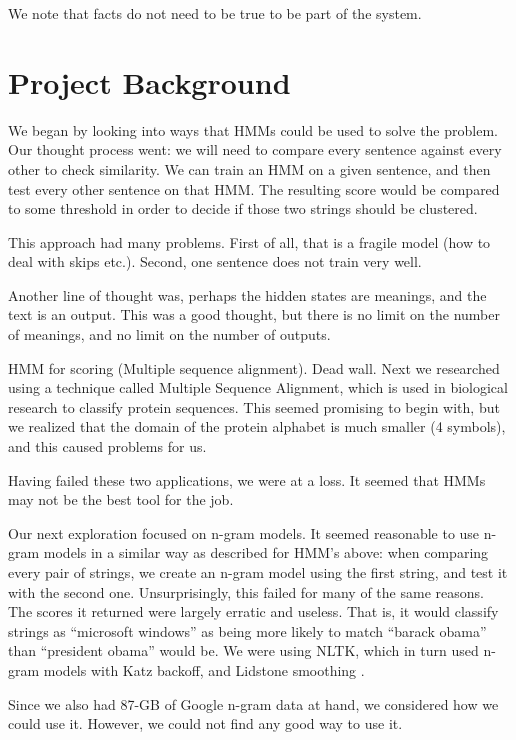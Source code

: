 \documentclass{article}
\begin{document}
We note that facts do not need to be true to be part of the system.



\section{Project Background}
We began by looking into ways that HMMs could be used to solve the problem. Our thought process went: we will need to compare every sentence against every other to check similarity. We can train an HMM on a given sentence, and then test every other sentence on that HMM. The resulting score would be compared to some threshold in order to decide if those two strings should be clustered. 

This approach had many problems. First of all, that is a fragile model (how to deal with skips etc.). Second, one sentence does not train very well. 

Another line of thought was, perhaps the hidden states are meanings, and the text is an output. This was a good thought, but there is no limit on the number of meanings, and no limit on the number of outputs. 


HMM for scoring (Multiple sequence alignment). Dead wall.
Next we researched using a technique called Multiple Sequence Alignment, which is used in biological research to classify protein sequences. This seemed promising to begin with, but we realized that the domain of the protein alphabet is much smaller (4 symbols), and this caused problems for us. 

Having failed these two applications, we were at a loss. It seemed that HMMs may not be the best tool for the job.

Our next exploration focused on n-gram models. It seemed reasonable to use n-gram models in a similar way as described for HMM's above: when comparing every pair of strings, we create an n-gram model using the first string, and test it with the second one. Unsurprisingly, this failed for many of the same reasons. The scores it returned were largely erratic and useless. That is, it would classify strings as ``microsoft windows'' as being more likely to match ``barack obama'' than ``president obama'' would be. We were using NLTK, which in turn used n-gram models with Katz backoff, and Lidstone smoothing \cite{nltk}. 

Since we also had 87-GB of Google n-gram data at hand, we considered how we could use it. However, we could not find any good way to use it.
\end{document}
